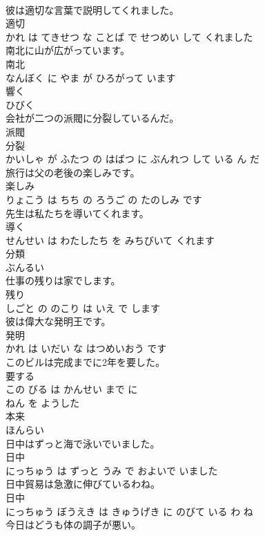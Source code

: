 \documentclass[8pt]{extreport}
\begin{document}
\begin{CJK}{UTF8}{min}
\\	彼は適切な言葉で説明してくれました。	
\\	適切 
\\	かれ は てきせつ な ことば で せつめい して くれました			
\\	南北に山が広がっています。	
\\	南北 
\\	なんぼく に やま が ひろがって います			
\\	響く	
\\	ひびく		
\\	会社が二つの派閥に分裂しているんだ。	
\\	派閥 
\\	分裂 
\\	かいしゃ が ふたつ の はばつ に ぶんれつ して いる ん だ			
\\	旅行は父の老後の楽しみです。	
\\	楽しみ 
\\	りょこう は ちち の ろうご の たのしみ です			
\\	先生は私たちを導いてくれます。	
\\	導く 
\\	せんせい は わたしたち を みちびいて くれます			
\\	分類	
\\	ぶんるい		
\\	仕事の残りは家でします。	
\\	残り 
\\	しごと の のこり は いえ で します			
\\	彼は偉大な発明王です。	
\\	発明 
\\	かれ は いだい な はつめいおう です			
\\	このビルは完成までに2年を要した。	
\\	要する 
\\	この びる は かんせい まで に 
\\	ねん を ようした			
\\	本来	
\\	ほんらい		
\\	日中はずっと海で泳いでいました。	
\\	日中 
\\	にっちゅう は ずっと うみ で およいで いました			
\\	日中貿易は急激に伸びているわね。	
\\	日中 
\\	にっちゅう ぼうえき は きゅうげき に のびて いる わ ね			
\\	今日はどうも体の調子が悪い。	

\end{CJK}
\end{document}
